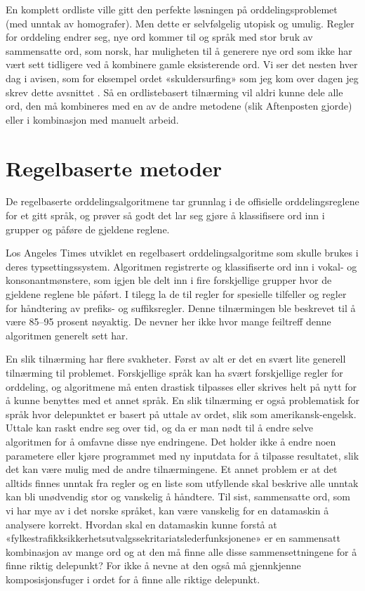 En komplett ordliste ville gitt den perfekte løsningen på orddelingsproblemet (med unntak av homografer). Men dette er selvfølgelig utopisk og umulig. Regler for orddeling endrer seg, nye ord kommer til og språk med stor bruk av sammensatte ord, som norsk, har muligheten til å generere nye ord som ikke har vært sett tidligere ved å kombinere gamle eksisterende ord. Vi ser det nesten hver dag i avisen, som for eksempel ordet «skuldersurfing» som jeg kom over dagen jeg skrev dette avsnittet \cite{skuldersurfing}. Så en ordlistebasert tilnærming vil aldri kunne dele alle ord, den må kombineres med en av de andre metodene (slik Aftenposten gjorde) eller i kombinasjon med manuelt arbeid.

\section{Regelbaserte metoder}

De regelbaserte orddelingsalgoritmene tar grunnlag i de offisielle orddelingsreglene for et gitt språk, og prøver så godt det lar seg gjøre å klassifisere ord inn i grupper og påføre de gjeldene reglene.

Los Angeles Times utviklet en regelbasert orddelingsalgoritme som skulle brukes i deres typsettingssystem. Algoritmen registrerte og klassifiserte ord inn i vokal- og konsonantmønstere, som igjen ble delt inn i fire forskjellige grupper hvor de gjeldene reglene ble påført. I tilegg la de til regler for spesielle tilfeller og regler for håndtering av prefiks- og suffiksregler. Denne tilnærmingen ble beskrevet til å være 85--95 prosent nøyaktig. \cite{liang1983word} De nevner her ikke hvor mange feiltreff denne algoritmen generelt sett har. 

En slik tilnærming har flere svakheter. Først av alt er det en svært lite generell tilnærming til problemet. Forskjellige språk kan ha svært forskjellige regler for orddeling, og algoritmene må enten drastisk tilpasses eller skrives helt på nytt for å kunne benyttes med et annet språk. En slik tilnærming er også problematisk for språk hvor delepunktet er basert på uttale av ordet, slik som amerikansk-engelsk. Uttale kan raskt endre seg over tid, og da er man nødt til å endre selve algoritmen for å omfavne disse nye endringene. Det holder ikke å endre noen parametere eller kjøre programmet med ny inputdata for å tilpasse resultatet, slik det kan være mulig med de andre tilnærmingene. Et annet problem er at det alltids finnes unntak fra regler og en liste som utfyllende skal beskrive alle unntak kan bli unødvendig stor og vanskelig å håndtere. Til sist, sammensatte ord, som vi har mye av i det norske språket, kan være vanskelig for en datamaskin å analysere korrekt. Hvordan skal en datamaskin kunne forstå at «fylkestrafikksikkerhetsutvalgssekritariatslederfunksjonene» er en sammensatt kombinasjon av mange ord og at den må finne alle disse sammensettningene for å finne riktig delepunkt? For ikke å nevne at den også må gjennkjenne komposisjonsfuger i ordet for å finne alle riktige delepunkt. \cite{liang1983word,thoresen1993virtuelle}

